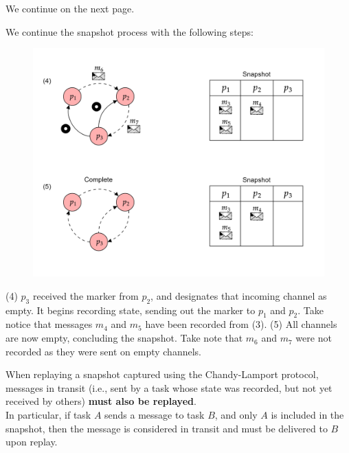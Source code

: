 \noindent
We continue on the next page.

\newpage 

\noindent
We continue the snapshot process with the following steps:
\begin{figure}[h] 
    \centering
    \includegraphics[width=1\textwidth]{Sections/snap/snap_exe_2.png}
\end{figure}

\noindent
(4) $p_3$ received the marker from $p_2$, and designates that incoming channel as empty. It begins recording state, sending out the marker to $p_1$ and $p_2$.
Take notice that messages $m_4$ and $m_5$ have been recorded from (3).
(5) All channels are now empty, concluding the snapshot. Take note that $m_6$ and $m_7$ were not recorded as they were sent on empty channels.\\

\begin{theo}

    When replaying a snapshot captured using the Chandy-Lamport protocol, 
    messages in transit (i.e., sent by a task whose state was recorded, but not yet received by others) 
    \textbf{must also be replayed}. \\

    \noindent
    In particular, if task $A$ sends a message to task $B$, and only $A$ is included in the snapshot,
    then the message is considered in transit and must be delivered to $B$ upon replay.
\end{theo}


\newpage 

